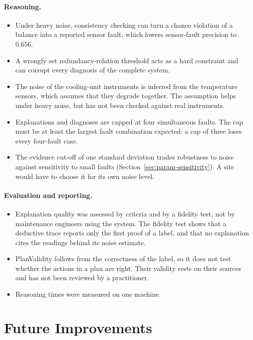 \paragraph{Reasoning.}
\begin{itemize}
  \item Under heavy noise, consistency checking can turn a chance violation of a balance into a reported sensor fault, which lowers sensor-fault precision to 0.656.
  \item A wrongly set redundancy-relation threshold acts as a hard constraint and can corrupt every diagnosis of the complete system.
  \item The noise of the cooling-unit instruments is inferred from the temperature sensors, which assumes that they degrade together. The assumption helps under heavy noise, but has not been checked against real instruments.
  \item Explanations and diagnoses are capped at four simultaneous faults. The cap must be at least the largest fault combination expected: a cap of three loses every four-fault case.
  \item The evidence cut-off of one standard deviation trades robustness to noise against sensitivity to small faults (Section~\ref{sec:param-sensitivity}). A site would have to choose it for its own noise level.
\end{itemize}

\paragraph{Evaluation and reporting.}
\begin{itemize}
  \item Explanation quality was assessed by criteria and by a fidelity test, not by maintenance engineers using the system. The fidelity test shows that a deductive trace reports only the first proof of a label, and that no explanation cites the readings behind its noise estimate.
  \item PlanValidity follows from the correctness of the label, so it does not test whether the actions in a plan are right. Their validity rests on their sources and has not been reviewed by a practitioner.
  \item Reasoning times were measured on one machine.
\end{itemize}

\section{Future Improvements}
\label{sec:future}


